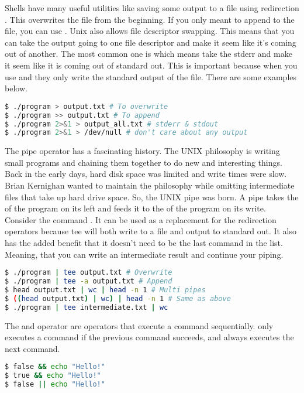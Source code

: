 Shells have many useful utilities like saving some output to a file using redirection \keyword{>}.
This overwrites the file from the beginning.
If you only meant to append to the file, you can use \keyword{>>}.
Unix also allows file descriptor swapping.
This means that you can take the output going to one file descriptor and make it seem like it's coming out of another.
The most common one is  which means take the stderr and make it seem like it is coming out of standard out.
This is important because when you use \keyword{>} and \keyword{>>} they only write the standard output of the file.
There are some examples below.

\begin{lstlisting}[language=bash]
$ ./program > output.txt # To overwrite
$ ./program >> output.txt # To append
$ ./program 2>&1 > output_all.txt # stderr & stdout
$ ./program 2>&1 > /dev/null # don't care about any output
\end{lstlisting}

The pipe operator has a fascinating history.
The UNIX philosophy is writing small programs and chaining them together to do new and interesting things.
Back in the early days, hard disk space was limited and write times were slow.
Brian Kernighan wanted to maintain the philosophy while omitting intermediate files that take up hard drive space.
So, the UNIX pipe was born.
A pipe takes the  of the program on its left and feeds it to the  of the program on its write.
Consider the command .
It can be used as a replacement for the redirection operators because tee will both write to a file and output to standard out.
It also has the added benefit that it doesn't need to be the last command in the list. Meaning, that you can write an intermediate result and continue your piping.

\begin{lstlisting}[language=bash]
$ ./program | tee output.txt # Overwrite
$ ./program | tee -a output.txt # Append
$ head output.txt | wc | head -n 1 # Multi pipes
$ ((head output.txt) | wc) | head -n 1 # Same as above
$ ./program | tee intermediate.txt | wc
\end{lstlisting}

The \keyword{&&} and \keyword{||} operator are operators that execute a command sequentially. \keyword{&&} only executes a command if the previous command succeeds, and \keyword{||} always executes the next command.

\begin{lstlisting}[language=bash]
$ false && echo "Hello!"
$ true && echo "Hello!"
$ false || echo "Hello!"
\end{lstlisting}

